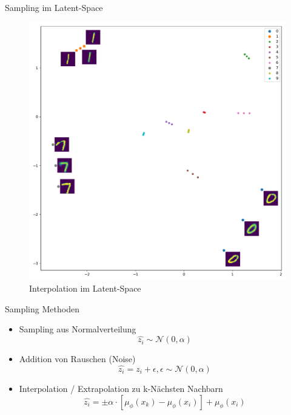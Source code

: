 \documentclass[10pt, compress]{beamer}
\begin{document}
\begin{frame}{Sampling im Latent-Space}
\begin{minipage}[c]{.5\textwidth}
\begin{figure}[hbt]
    \includegraphics[width=\textwidth]{gfx/evaluation/feature_space/interpolation}
    \caption{Interpolation im Latent-Space}
  \end{figure}
\end{minipage}
\end{frame}

\begin{frame}{Sampling Methoden}
\begin{itemize}
  \item Sampling aus Normalverteilung
    \begin{equation*}
      \hat{z_i} \sim \mathcal{N}(0, \alpha)
    \end{equation*}
  \item Addition von Rauschen (Noise)
    \begin{equation*}
      \hat{z_i} = z_i + \epsilon, \epsilon \sim \mathcal{N}(0, \alpha)
    \end{equation*}
  \item Interpolation / Extrapolation zu k-Nächsten Nachbarn
    \begin{equation*}
      \hat{z_i} = \pm \alpha \cdot \left[\mu_\phi(x_k) - \mu_\phi(x_i)\right] + \mu_\phi(x_i)
    \end{equation*}
\end{itemize}
\end{frame}
\end{document}
